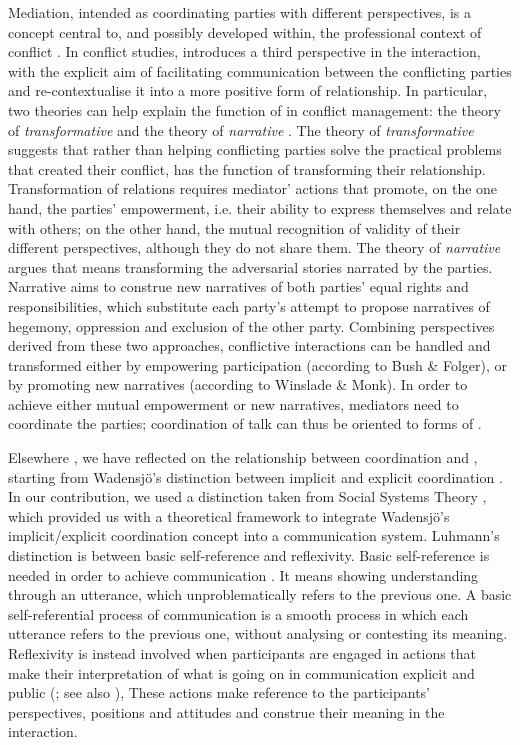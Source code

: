 \documentclass[output=paper]{LSP/langsci}
\begin{document}
Mediation, intended as coordinating parties with different perspectives, is a concept central to, and possibly developed within, the professional context of conflict . In conflict studies,   introduces a third perspective in the interaction, with the explicit aim of facilitating communication between the conflicting parties and re-contextualise it into a more positive form of relationship. In particular, two theories can help explain the function of  in conflict management: the theory of \textit{transformative}  and the theory of \textit{narrative} . The theory of \textit{transformative}  \citep{Bush1994} suggests  that rather than helping conflicting parties solve the practical problems that created their conflict,  has the function of transforming their relationship. Transformation of relations requires mediator' actions that promote, on the one hand, the parties' empowerment, i.e. their ability to  express themselves and relate with others; on the other hand, the mutual recognition of validity of their different perspectives, although they do not share them. The theory of \textit{narrative}  \citep{Winslade2008} argues that  means transforming the adversarial stories narrated by the parties. Narrative  aims to construe new narratives of both parties' equal rights and responsibilities, which substitute each party's attempt to propose narratives of hegemony, oppression and exclusion of the other party. Combining perspectives derived from these two approaches, conflictive interactions can be handled and transformed either by empowering participation (according to Bush \& Folger), or by promoting new narratives (according to Winslade \& Monk). In order to achieve either mutual empowerment or new narratives, mediators need to coordinate the parties; coordination of talk can thus be oriented to forms of . 

Elsewhere \citep{Baraldi2012}, we have reflected on the relationship between coordination and , starting from Wadensjö's distinction between implicit and explicit coordination \citeyearpar{Wadensjo1998}. In our contribution, we used a distinction taken from Social Systems Theory \citep{Luhmann1984}, which provided us with a theoretical framework to integrate Wadensjö's implicit/explicit coordination concept into a communication system. Luhmann's distinction is between basic self-reference and reflexivity. Basic self-reference is needed in order to achieve communication \citep[600-601]{Luhmann1984}. It means showing understanding through an utterance, which unproblematically refers to the previous one. A basic self-referential  process of communication is a smooth process in which each utterance refers to the previous one, without analysing or contesting its meaning. Reflexivity is instead involved when participants are engaged in actions that make their interpretation of what is going on in communication explicit and public (\citealt[601]{Luhmann1984}; see also \citealt{Heritage1985, Pearce1980, Weigand2010}), These actions make reference to the participants' perspectives, positions and attitudes and construe their meaning in the interaction. 
\end{document}
